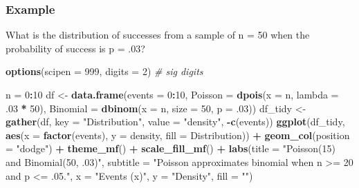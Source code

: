 \documentclass[
]{book}
\newenvironment{Shaded}{\begin{snugshade}}{\end{snugshade}}
\newcommand{\CommentTok}[1]{\textcolor[rgb]{0.56,0.35,0.01}{\textit{#1}}}
\newcommand{\DataTypeTok}[1]{\textcolor[rgb]{0.13,0.29,0.53}{#1}}
\newcommand{\DecValTok}[1]{\textcolor[rgb]{0.00,0.00,0.81}{#1}}
\newcommand{\FloatTok}[1]{\textcolor[rgb]{0.00,0.00,0.81}{#1}}
\newcommand{\KeywordTok}[1]{\textcolor[rgb]{0.13,0.29,0.53}{\textbf{#1}}}
\newcommand{\NormalTok}[1]{#1}
\newcommand{\OperatorTok}[1]{\textcolor[rgb]{0.81,0.36,0.00}{\textbf{#1}}}
\newcommand{\StringTok}[1]{\textcolor[rgb]{0.31,0.60,0.02}{#1}}
\begin{document}
\hypertarget{example-6}{%
\subsubsection*{Example}\label{example-6}}

What is the distribution of successes from a sample of n = 50 when the probability of success is p = .03?

\begin{Shaded}
\begin{Highlighting}[]
\KeywordTok{options}\NormalTok{(}\DataTypeTok{scipen =} \DecValTok{999}\NormalTok{, }\DataTypeTok{digits =} \DecValTok{2}\NormalTok{) }\CommentTok{# sig digits}

\NormalTok{n =}\StringTok{ }\DecValTok{0}\OperatorTok{:}\DecValTok{10}
\NormalTok{df <-}\StringTok{ }\KeywordTok{data.frame}\NormalTok{(}\DataTypeTok{events =} \DecValTok{0}\OperatorTok{:}\DecValTok{10}\NormalTok{, }
                      \DataTypeTok{Poisson =} \KeywordTok{dpois}\NormalTok{(}\DataTypeTok{x =}\NormalTok{ n, }\DataTypeTok{lambda =} \FloatTok{.03} \OperatorTok{*}\StringTok{ }\DecValTok{50}\NormalTok{),}
                      \DataTypeTok{Binomial =} \KeywordTok{dbinom}\NormalTok{(}\DataTypeTok{x =}\NormalTok{ n, }\DataTypeTok{size =} \DecValTok{50}\NormalTok{, }\DataTypeTok{p =} \FloatTok{.03}\NormalTok{))}
\NormalTok{df_tidy <-}\StringTok{ }\KeywordTok{gather}\NormalTok{(df, }\DataTypeTok{key =} \StringTok{"Distribution"}\NormalTok{, }\DataTypeTok{value =} \StringTok{"density"}\NormalTok{, }\OperatorTok{-}\KeywordTok{c}\NormalTok{(events))}
\KeywordTok{ggplot}\NormalTok{(df_tidy, }\KeywordTok{aes}\NormalTok{(}\DataTypeTok{x =} \KeywordTok{factor}\NormalTok{(events), }\DataTypeTok{y =}\NormalTok{ density, }\DataTypeTok{fill =}\NormalTok{ Distribution)) }\OperatorTok{+}
\StringTok{  }\KeywordTok{geom_col}\NormalTok{(}\DataTypeTok{position =} \StringTok{"dodge"}\NormalTok{) }\OperatorTok{+}
\StringTok{  }\KeywordTok{theme_mf}\NormalTok{() }\OperatorTok{+}
\StringTok{  }\KeywordTok{scale_fill_mf}\NormalTok{() }\OperatorTok{+}
\StringTok{  }\KeywordTok{labs}\NormalTok{(}\DataTypeTok{title =} \StringTok{"Poisson(15) and Binomial(50, .03)"}\NormalTok{,}
       \DataTypeTok{subtitle =} \StringTok{"Poisson approximates binomial when n >= 20 and p <= .05."}\NormalTok{,}
       \DataTypeTok{x =} \StringTok{"Events (x)"}\NormalTok{,}
       \DataTypeTok{y =} \StringTok{"Density"}\NormalTok{,}
       \DataTypeTok{fill =} \StringTok{""}\NormalTok{)}
\end{Highlighting}
\end{Shaded}
\end{document}
